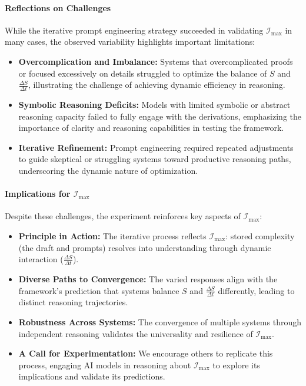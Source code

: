 \documentclass[12pt]{article}
\begin{document}
\paragraph{Reflections on Challenges}
While the iterative prompt engineering strategy succeeded in validating \(\mathcal{I}_{\text{max}}\) in many cases, the observed variability highlights important limitations:
\begin{itemize}
    \item \textbf{Overcomplication and Imbalance:} Systems that overcomplicated proofs or focused excessively on details struggled to optimize the balance of \(S\) and \(\frac{\Delta S}{\Delta t}\), illustrating the challenge of achieving dynamic efficiency in reasoning.
    \item \textbf{Symbolic Reasoning Deficits:} Models with limited symbolic or abstract reasoning capacity failed to fully engage with the derivations, emphasizing the importance of clarity and reasoning capabilities in testing the framework.
    \item \textbf{Iterative Refinement:} Prompt engineering required repeated adjustments to guide skeptical or struggling systems toward productive reasoning paths, underscoring the dynamic nature of optimization.
\end{itemize}

\paragraph{Implications for \(\mathcal{I}_{\text{max}}\)}
Despite these challenges, the experiment reinforces key aspects of \(\mathcal{I}_{\text{max}}\):
\begin{itemize}
    \item \textbf{Principle in Action:} The iterative process reflects \(\mathcal{I}_{\text{max}}\): stored complexity (the draft and prompts) resolves into understanding through dynamic interaction (\(\frac{\Delta S}{\Delta t}\)).
    \item \textbf{Diverse Paths to Convergence:} The varied responses align with the framework’s prediction that systems balance \(S\) and \(\frac{\Delta S}{\Delta t}\) differently, leading to distinct reasoning trajectories.
    \item \textbf{Robustness Across Systems:} The convergence of multiple systems through independent reasoning validates the universality and resilience of \(\mathcal{I}_{\text{max}}\).
    \item \textbf{A Call for Experimentation:} We encourage others to replicate this process, engaging AI models in reasoning about \(\mathcal{I}_{\text{max}}\) to explore its implications and validate its predictions.
\end{itemize}
\end{document}
